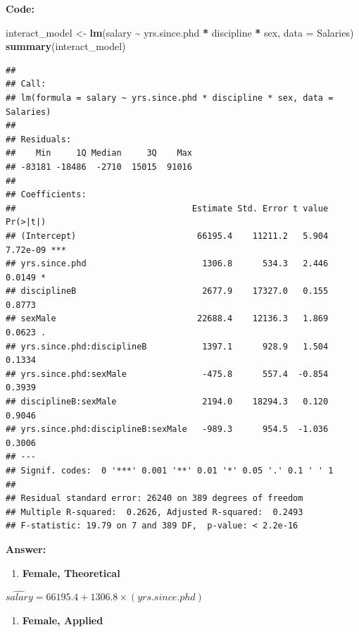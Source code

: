 \documentclass[
]{article}
\newenvironment{Shaded}{\begin{snugshade}}{\end{snugshade}}
\newcommand{\AttributeTok}[1]{\textcolor[rgb]{0.13,0.29,0.53}{#1}}
\newcommand{\FunctionTok}[1]{\textcolor[rgb]{0.13,0.29,0.53}{\textbf{#1}}}
\newcommand{\NormalTok}[1]{#1}
\newcommand{\OtherTok}[1]{\textcolor[rgb]{0.56,0.35,0.01}{#1}}
\newcommand{\SpecialCharTok}[1]{\textcolor[rgb]{0.81,0.36,0.00}{\textbf{#1}}}
\providecommand{\tightlist}{%
  \setlength{\itemsep}{0pt}\setlength{\parskip}{0pt}}
\begin{document}
\textbf{Code:}

\begin{Shaded}
\begin{Highlighting}[]
\NormalTok{interact\_model }\OtherTok{\textless{}{-}} \FunctionTok{lm}\NormalTok{(salary }\SpecialCharTok{\textasciitilde{}}\NormalTok{ yrs.since.phd }\SpecialCharTok{*}\NormalTok{ discipline }\SpecialCharTok{*}\NormalTok{ sex, }\AttributeTok{data =}\NormalTok{ Salaries)}
\FunctionTok{summary}\NormalTok{(interact\_model)}
\end{Highlighting}
\end{Shaded}

\begin{verbatim}
## 
## Call:
## lm(formula = salary ~ yrs.since.phd * discipline * sex, data = Salaries)
## 
## Residuals:
##    Min     1Q Median     3Q    Max 
## -83181 -18486  -2710  15015  91016 
## 
## Coefficients:
##                                   Estimate Std. Error t value Pr(>|t|)    
## (Intercept)                        66195.4    11211.2   5.904 7.72e-09 ***
## yrs.since.phd                       1306.8      534.3   2.446   0.0149 *  
## disciplineB                         2677.9    17327.0   0.155   0.8773    
## sexMale                            22688.4    12136.3   1.869   0.0623 .  
## yrs.since.phd:disciplineB           1397.1      928.9   1.504   0.1334    
## yrs.since.phd:sexMale               -475.8      557.4  -0.854   0.3939    
## disciplineB:sexMale                 2194.0    18294.3   0.120   0.9046    
## yrs.since.phd:disciplineB:sexMale   -989.3      954.5  -1.036   0.3006    
## ---
## Signif. codes:  0 '***' 0.001 '**' 0.01 '*' 0.05 '.' 0.1 ' ' 1
## 
## Residual standard error: 26240 on 389 degrees of freedom
## Multiple R-squared:  0.2626, Adjusted R-squared:  0.2493 
## F-statistic: 19.79 on 7 and 389 DF,  p-value: < 2.2e-16
\end{verbatim}

\textbf{Answer:}

\begin{enumerate}
\def\labelenumi{\arabic{enumi}.}
\tightlist
\item
  \textbf{Female, Theoretical}
\end{enumerate}

\(\hat{salary} = 66195.4 + 1306.8 \times (yrs.since.phd)\)

\begin{enumerate}
\def\labelenumi{\arabic{enumi}.}
\setcounter{enumi}{1}
\tightlist
\item
  \textbf{Female, Applied}
\end{enumerate}
\end{document}
